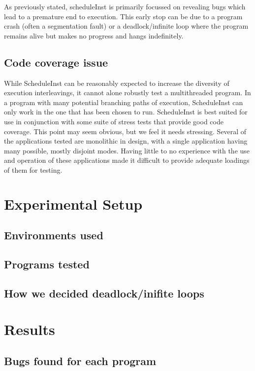 \documentclass[10pt,]{article} %
\begin{document}
As previously stated, scheduleInst is primarily focussed on revealing bugs which lead to a premature end to execution.  This early stop can be due to a program crash (often a segmentation fault) or a deadlock/infinite loop where the program remains alive but makes no progress and hangs indefinitely.  


\subsection{Code coverage issue}

	While ScheduleInst can be reasonably expected to increase the diversity of execution interleavings, it cannot alone robustly test a multithreaded program.  In a program with many potential branching paths of execution, ScheduleInst can only work in the one that has been chosen to run.   ScheduleInst is best suited for use in conjunction with some suite of stress tests that provide good code coverage.  This point may seem obvious, but we feel it needs stressing.  Several of the applications tested are monolithic in design, with a single application having many possible, mostly disjoint modes.  Having little to no experience with the use and operation of these applications made it difficult to provide adequate loadings of them for testing. 



\section{Experimental Setup}


\subsection{Environments used}

\subsection{Programs tested}
	
\subsection{How we decided deadlock/inifite loops}


\section{Results}


\subsection{Bugs found for each program}
\end{document}

